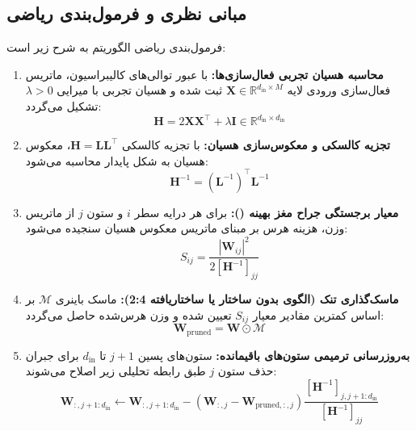 \subsection{مبانی نظری و فرمول‌بندی ریاضی}
فرمول‌بندی ریاضی الگوریتم  به شرح زیر است:
\begin{enumerate}
    \item \textbf{محاسبه هسیان تجربی فعال‌سازی‌ها:}
    با عبور توالی‌های کالیبراسیون، ماتریس فعال‌سازی ورودی لایه $\mathbf{X} \in \mathbb{R}^{d_{\text{in}} \times M}$ ثبت شده و هسیان تجربی با میرایی $\lambda > 0$ تشکیل می‌گردد:
    \begin{equation}
    \mathbf{H} = 2 \mathbf{X} \mathbf{X}^\top + \lambda \mathbf{I} \in \mathbb{R}^{d_{\text{in}} \times d_{\text{in}}}
    \end{equation}
    \item \textbf{تجزیه کالسکی و معکوس‌سازی هسیان:}
    با تجزیه کالسکی $\mathbf{H} = \mathbf{L} \mathbf{L}^\top$، معکوس هسیان به شکل پایدار محاسبه می‌شود:
    \begin{equation}
    \mathbf{H}^{-1} = (\mathbf{L}^{-1})^\top \mathbf{L}^{-1}
    \end{equation}
    \item \textbf{معیار برجستگی جراح مغز بهینه ():}
    برای هر درایه سطر $i$ و ستون $j$ از ماتریس وزن، هزینه هرس بر مبنای ماتریس معکوس هسیان سنجیده می‌شود:
    \begin{equation}
    S_{ij} = \frac{|\mathbf{W}_{ij}|^2}{2 [\mathbf{H}^{-1}]_{jj}}
    \end{equation}
    \item \textbf{ماسک‌گذاری تنک (الگوی بدون ساختار یا ساختاریافته 2:4):}
    ماسک باینری $\boldsymbol{\mathcal{M}}$ بر اساس کمترین مقادیر معیار $S_{ij}$ تعیین شده و وزن هرس‌شده حاصل می‌گردد:
    \begin{equation}
    \mathbf{W}_{\text{pruned}} = \mathbf{W} \odot \boldsymbol{\mathcal{M}}
    \end{equation}
    \item \textbf{به‌روزرسانی ترمیمی ستون‌های باقیمانده:}
    ستون‌های پسین $j+1$ تا $d_{\text{in}}$ برای جبران حذف ستون $j$ طبق رابطه تحلیلی زیر اصلاح می‌شوند:
    \begin{equation}
    \mathbf{W}_{:, j+1:d_{\text{in}}} \leftarrow \mathbf{W}_{:, j+1:d_{\text{in}}} - (\mathbf{W}_{:, j} - \mathbf{W}_{\text{pruned}, :, j}) \frac{[\mathbf{H}^{-1}]_{j, j+1:d_{\text{in}}}}{[\mathbf{H}^{-1}]_{jj}}
    \end{equation}
\end{enumerate}

